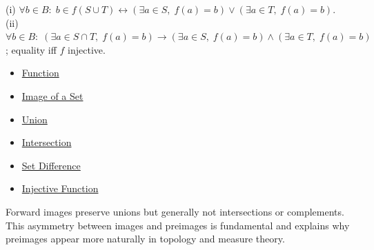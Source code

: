 \begin{remark*}
(i) $\forall b\in B:\; b \in f(S\cup T) \leftrightarrow (\exists a\in S,\; f(a)=b) \vee (\exists a\in T,\; f(a)=b)$.\\
(ii) $\forall b\in B:\; (\exists a\in S\cap T,\; f(a)=b) \to (\exists a\in S,\; f(a)=b) \wedge (\exists a\in T,\; f(a)=b)$; equality iff $f$ injective.
\end{remark*}

\begin{dependencies}
\begin{itemize}
  \item \hyperref[def:function]{Function}
  \item \hyperref[def:image-set]{Image of a Set}
  \item \hyperref[def:union]{Union}
  \item \hyperref[def:intersection]{Intersection}
  \item \hyperref[def:set-difference]{Set Difference}
  \item \hyperref[def:injective]{Injective Function}
\end{itemize}
\end{dependencies}

\begin{remark*}
Forward images preserve unions but generally not intersections or complements.
This asymmetry between images and preimages is fundamental and explains why
preimages appear more naturally in topology and measure theory.
\end{remark*}
